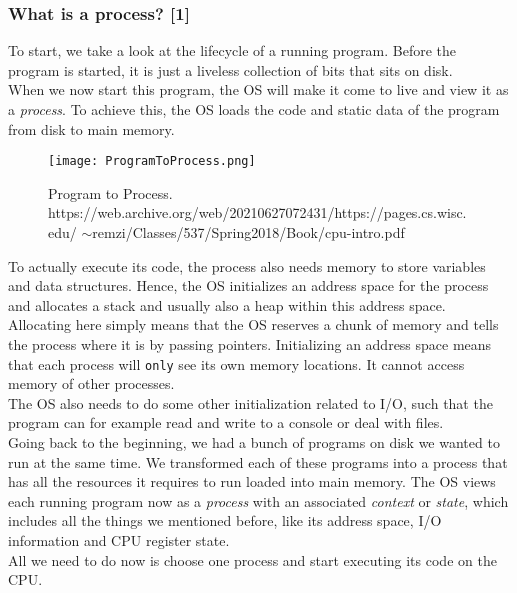 \documentclass[main]{subfiles}
\begin{document}
\subsubsection{What is a process? [1]}
To start, we take a look at the lifecycle of a running program. Before the program is started, it is just a liveless collection of bits that sits on disk.\\
When we now start this program, the OS will make it come to live and view it as a \textit{process}. To achieve this, the OS loads the code and static data of the program from disk to main memory.
\begin{figure}[H]
    \centering
    \texttt{[image: ProgramToProcess.png]}
    \caption{Program to Process. https://web.archive.org/web/20210627072431/https://pages.cs.wisc.edu/
    $\sim$remzi/Classes/537/Spring2018/Book/cpu-intro.pdf}
\end{figure}
To actually execute its code, the process also needs memory to store variables and data structures. Hence, the OS initializes an address space for the process and allocates a stack and usually also a heap within this address space. Allocating here simply means that the OS reserves a chunk of memory and tells the process where it is by passing pointers. Initializing an address space means that each process will \texttt{only} see its own memory locations. It cannot access memory of other processes.\\[3mm]
The OS also needs to do some other initialization related to I/O, such that the program can for example read and write to a console or deal with files.\\[3mm]
Going back to the beginning, we had a bunch of programs on disk we wanted to run at the same time. We transformed each of these programs into a process that has all the resources it requires to run loaded into main memory.
The OS views each running program now as a \textit{process} with an associated \textit{context} or \textit{state}, which includes all the things we mentioned before, like its address space, I/O information and CPU register state.\\[3mm]
All we need to do now is choose one process and start executing its code on the CPU.
\end{document}
